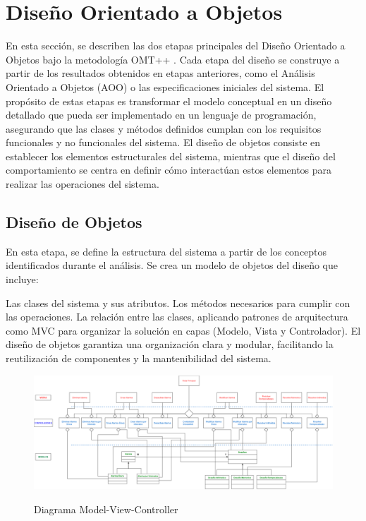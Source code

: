 \section{Diseño Orientado a Objetos}
En esta sección, se describen las dos etapas principales del Diseño Orientado a Objetos bajo la metodología OMT++ . Cada etapa del diseño se construye a partir de los resultados obtenidos en etapas anteriores, como el Análisis Orientado a Objetos (AOO) o las especificaciones iniciales del sistema. El propósito de estas etapas es transformar el modelo conceptual en un diseño detallado que pueda ser implementado en un lenguaje de programación, asegurando que las clases y métodos definidos cumplan con los requisitos funcionales y no funcionales del sistema.
El diseño de objetos consiste en establecer los elementos estructurales del sistema, mientras que el diseño del comportamiento se centra en definir cómo interactúan estos elementos para realizar las operaciones del sistema.

 \subsection{Diseño de Objetos}
 En esta etapa, se define la estructura del sistema a partir de los conceptos identificados durante el análisis. Se crea un modelo de objetos del diseño que incluye:

 Las clases del sistema y sus atributos.
 Los métodos necesarios para cumplir con las operaciones.
 La relación entre las clases, aplicando patrones de arquitectura como MVC para organizar la solución en capas (Modelo, Vista y Controlador).
 El diseño de objetos garantiza una organización clara y modular, facilitando la reutilización de componentes y la mantenibilidad del sistema.

 \begin{figure}[H]
	\centering
        \vspace{10pt}
	\caption{Diagrama Model-View-Controller}
	\includegraphics[width=\textwidth]{./img/MVC.png}
	\label{fig:Diagrama Model-View-Controller}
\end{figure}

